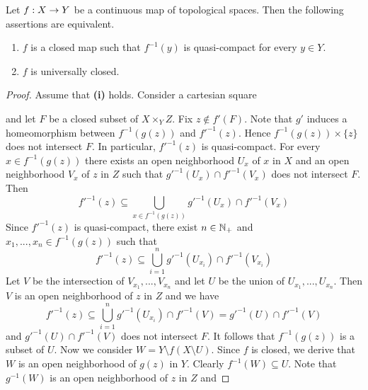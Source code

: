 \begin{theorem}\label{theorem:characterization_of_universally_closed_maps}
	Let $f:X\rightarrow Y$ be a continuous map of topological spaces. Then the following assertions are equivalent.
	\begin{enumerate}[label=\emph{\textbf{(\roman*)}}, leftmargin=3.0em]
		\item $f$ is a closed map such that $f^{-1}(y)$ is quasi-compact for every $y \in Y$.
		\item $f$ is universally closed.
	\end{enumerate}
\end{theorem}
\begin{proof}
	Assume that \textbf{(i)} holds. Consider a cartesian square
	\begin{center}
	\end{center}
	and let $F$ be a closed subset of $X\times_YZ$. Fix $z \not \in f'(F)$. Note that $g'$ induces a homeomorphism between $f^{-1}(g(z))$ and $f'^{-1}(z)$. Hence $f^{-1}(g(z))\times \{z\}$ does not intersect $F$. In particular, $f'^{-1}(z)$ is quasi-compact. For every $x \in f^{-1}(g(z))$ there exists an open neighborhood $U_x$ of $x$ in $X$ and an open neighborhood $V_x$ of $z$ in $Z$ such that $g'^{-1}(U_x)\cap f'^{-1}(V_x)$ does not intersect $F$. Then
	$$f'^{-1}(z)  \subseteq \bigcup_{x\in f^{-1}(g(z))}g'^{-1}(U_x)\cap f'^{-1}(V_x)$$
	Since $f'^{-1}(z)$ is quasi-compact, there exist $n\in {\mathbb N}_+$ and $x_1,...,x_n \in f^{-1}(g(z))$ such that
	$$f'^{-1}(z)  \subseteq \bigcup_{i=1}^n g'^{-1}(U_{x_i})\cap f'^{-1}(V_{x_i})$$
	Let $V$ be the intersection of $V_{x_1},...,V_{x_n}$ and let $U$ be the union of $U_{x_1},...,U_{x_n}$. Then $V$ is an open neighborhood of $z$ in $Z$ and we have
	$$f'^{-1}(z) \subseteq \bigcup_{i=1}^n g'^{-1}(U_{x_i})\cap f'^{-1}(V) = g'^{-1}(U) \cap f'^{-1}(V)$$
	and $g'^{-1}(U)\cap f'^{-1}(V)$ does not intersect $F$. It follows that $f^{-1}(g(z))$ is a subset of $U$. Now we consider $W = Y\setminus f(X\setminus U)$. Since $f$ is closed, we derive that $W$ is an open neighborhood of $g(z)$ in $Y$. Clearly $f^{-1}(W) \subseteq U$. Note that $g^{-1}(W)$ is an open neighborhood of $z$ in $Z$ and

\end{proof}
